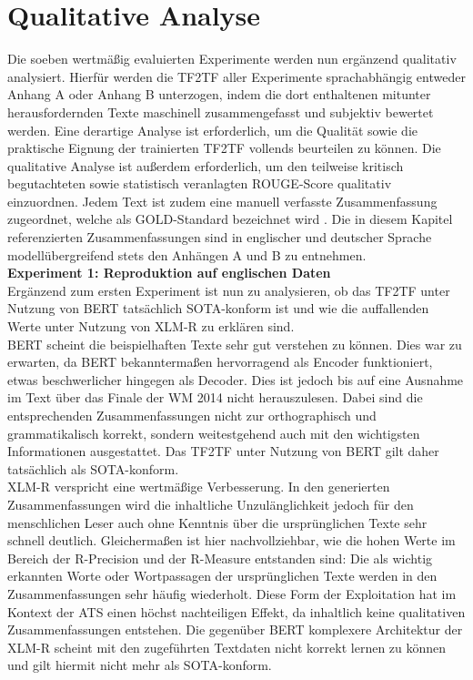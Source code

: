 \section{Qualitative Analyse}
\noindent
Die soeben wertmäßig evaluierten Experimente werden nun ergänzend qualitativ analysiert. Hierfür werden die \ac{TF2TF} aller Experimente sprachabhängig entweder Anhang A oder Anhang B unterzogen, indem die dort enthaltenen mitunter herausfordernden Texte maschinell zusammengefasst und subjektiv bewertet werden. Eine derartige Analyse ist erforderlich, um die Qualität sowie die praktische Eignung der trainierten \ac{TF2TF} vollends beurteilen zu können. Die qualitative Analyse ist außerdem erforderlich, um den teilweise kritisch begutachteten sowie statistisch veranlagten \ac{ROUGE}-Score qualitativ einzuordnen. Jedem Text ist zudem eine manuell verfasste Zusammenfassung zugeordnet, welche als GOLD-Standard bezeichnet wird \cite{WIS14}. Die in diesem Kapitel referenzierten Zusammenfassungen sind in englischer und deutscher Sprache modellübergreifend stets den Anhängen A und B zu entnehmen.\\

\noindent
\textbf{Experiment 1: Reproduktion auf englischen Daten}\\
\noindent
Ergänzend zum ersten Experiment ist nun zu analysieren, ob das \ac{TF2TF} unter Nutzung von \ac{BERT} tatsächlich \ac{SOTA}-konform ist und wie die auffallenden Werte unter Nutzung von \ac{XLM-R} zu erklären sind.\\

\noindent
\ac{BERT} scheint die beispielhaften Texte sehr gut verstehen zu können. Dies war zu erwarten, da \ac{BERT} bekanntermaßen hervorragend als Encoder funktioniert, etwas beschwerlicher hingegen als Decoder. Dies ist jedoch bis auf eine Ausnahme im Text über das Finale der WM 2014 nicht herauszulesen. Dabei sind die entsprechenden Zusammenfassungen nicht zur orthographisch und grammatikalisch korrekt, sondern weitestgehend auch mit den wichtigsten Informationen ausgestattet. Das \ac{TF2TF} unter Nutzung von \ac{BERT} gilt daher tatsächlich als \ac{SOTA}-konform.\\

\noindent
\ac{XLM-R} verspricht eine wertmäßige Verbesserung. In den generierten Zusammenfassungen wird die inhaltliche Unzulänglichkeit jedoch für den menschlichen Leser auch ohne Kenntnis über die ursprünglichen Texte sehr schnell deutlich. Gleichermaßen ist hier nachvollziehbar, wie die hohen Werte im Bereich der R-Precision und der R-Measure entstanden sind: Die als wichtig erkannten Worte oder Wortpassagen der ursprünglichen Texte werden in den Zusammenfassungen sehr häufig wiederholt. Diese Form der Exploitation hat im Kontext der \ac{ATS} einen höchst nachteiligen Effekt, da inhaltlich keine qualitativen Zusammenfassungen entstehen. Die gegenüber \ac{BERT} komplexere Architektur der \ac{XLM-R} scheint mit den zugeführten Textdaten nicht korrekt lernen zu können und gilt hiermit nicht mehr als \ac{SOTA}-konform.
\newpage

